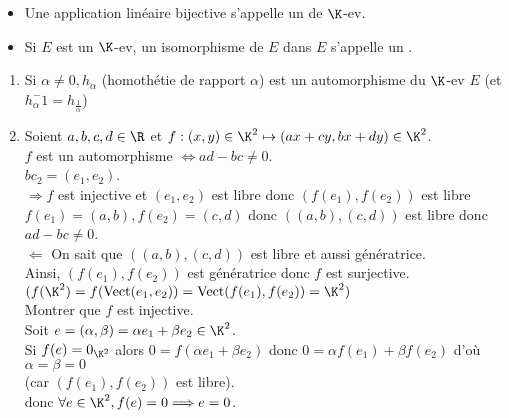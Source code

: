 \documentclass[12pt, a4paper]{report}
\begin{document}
\begin{remarque}{}
\begin{remarque}[Vocabulaire]{}
\begin{itemize}
	\item Une application linéaire bijective s'appelle un  de $\K$-ev.
	\item Si $E$ est un $\K$-ev, un isomorphisme de $E$ dans $E$ s'appelle un .
\end{itemize}
\end{remarque}

\begin{remarque}{}
\begin{enumerate}
	\item Si $\alpha \ne 0, h_\alpha$ (homothétie de rapport $\alpha$) est un automorphisme du $\K$-ev $E$ (et $h_\alpha^-1 = h_{\frac{1}{\alpha}}$)
	
	\item Soient $a,b,c,d \in \R$ et $f : (x,y) \in \K^2 \mapsto (ax+cy,bx+dy) \in \K^2$. \\
	$f$ est un automorphisme $\Longleftrightarrow ad-bc \ne 0$. \\
	$bc_2 = (e_1,e_2)$. \\
	
	$\Longrightarrow f$ est injective et $(e_1,e_2)$ est libre donc $(f(e_1),f(e_2))$ est libre \\
	$f(e_1)=(a,b), f(e_2)=(c,d)$ donc $((a,b),(c,d))$ est libre donc $ad-bc \ne 0$. \\
	
	$\Longleftarrow$ On sait que $((a,b),(c,d))$ est libre et aussi génératrice. \\
	Ainsi, $(f(e_1),f(e_2))$ est génératrice donc $f$ est surjective. \\
	$(f(\K^2) = f(\text{Vect}(e_1,e_2)) = \text{Vect}(f(e_1),f(e_2)) = \K^2)$ \\
	
	Montrer que $f$ est injective. \\
	Soit $e = (\alpha,\beta) = \alpha e_1 + \beta e_2 \in \K^2$. \\
	Si $f(e) = 0_{\K^2}$ alors $0 = f(\alpha e_1 + \beta e_2)$ donc $0 = \alpha f(e_1) + \beta f(e_2)$ d'où $\alpha = \beta = 0$ \\
	(car $(f(e_1),f(e_2))$ est libre). \\
	donc $\forall e \in \K^2, f(e) = 0 \Longrightarrow e = 0$.
\end{enumerate}
\end{remarque}


\end{remarque}
\end{document}
